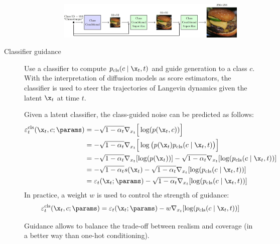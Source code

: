 \begin{description}
\begin{description}
            \begin{figure}[H]
                \centering
                \includegraphics[width=0.9\linewidth]{./img/cascaded_diffusion_models.jpg}
            \end{figure}
        \end{description}

    \item[Classifier guidance] 
        Use a classifier to compute $p_\text{cls}(c \mid \x_t, t)$ and guide generation to a class $c$. With the interpretation of diffusion models as score estimators, the classifier is used to steer the trajectories of Langevin dynamics given the latent $\x_t$ at time $t$.

        Given a latent classifier, the class-guided noise can be predicted as follows:
        \[
            \begin{split}
                \varepsilon_t^{\text{cls}}(\x_t, c; \params) 
                &= -\sqrt{1-\alpha_t} \nabla_{x_t}\Big[ \log(p(\x_t, c)) \Big] \\
                &= -\sqrt{1-\alpha_t} \nabla_{x_t}\Big[ \log\big(p(\x_t) p_\text{cls}(c \mid \x_t, t)\big) \Big] \\
                &= -\sqrt{1-\alpha_t} \nabla_{x_t}[ \log(p(\x_t)) ] - \sqrt{1-\alpha_t} \nabla_{x_t}[ \log(p_\text{cls}(c \mid \x_t, t)) ] \\
                &= -\sqrt{1-\alpha_t} s(\x_t) - \sqrt{1-\alpha_t} \nabla_{x_t}[ \log(p_\text{cls}(c \mid \x_t, t)) ] \\
                &= \varepsilon_t(\x_t; \params) - \sqrt{1-\alpha_t} \nabla_{x_t}[ \log(p_\text{cls}(c \mid \x_t, t)) ]
            \end{split}
        \]
        In practice, a weight $w$ is used to control the strength of guidance:
        \[ \varepsilon_t^{\text{cls}}(\x_t, c; \params) = \varepsilon_t(\x_t; \params) - w \nabla_{x_t}[ \log(p_\text{cls}(c \mid \x_t, t)) ] \]

        \begin{remark}
            Guidance allows to balance the trade-off between realism and coverage (in a better way than one-hot conditioning).
        \end{remark}


\end{description}

